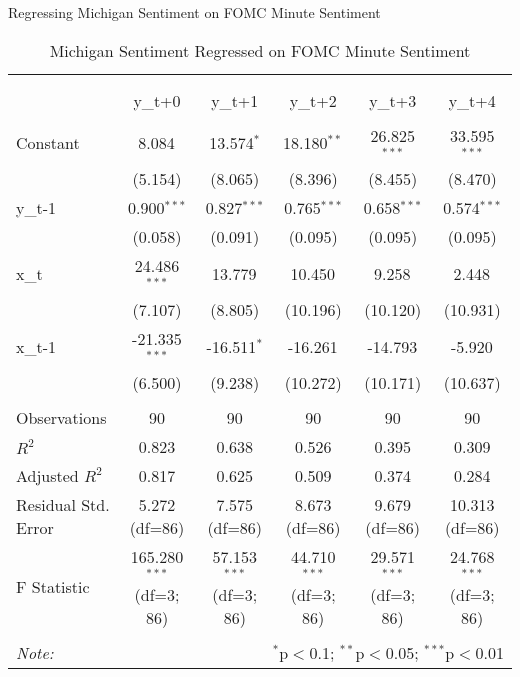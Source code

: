 \documentclass[12pt, letterpaper]{article}
\begin{document}
Regressing Michigan Sentiment on FOMC Minute Sentiment

\begin{table}[H] \centering
  \caption{Michigan Sentiment Regressed on FOMC Minute Sentiment}
\begin{tabular}{@{\extracolsep{5pt}}lccccc}
\\[-1.8ex]\hline
\hline \\[-1.8ex]
\\[-1.8ex] & \multicolumn{1}{c}{y_{t+0}} & \multicolumn{1}{c}{y_{t+1}} & \multicolumn{1}{c}{y_{t+2}} & \multicolumn{1}{c}{y_{t+3}} & \multicolumn{1}{c}{y_{t+4}}  \\
\hline \\[-1.8ex]
 Constant & 8.084$^{}$ & 13.574$^{*}$ & 18.180$^{**}$ & 26.825$^{***}$ & 33.595$^{***}$ \\
& (5.154) & (8.065) & (8.396) & (8.455) & (8.470) \\
 y_{t-1} & 0.900$^{***}$ & 0.827$^{***}$ & 0.765$^{***}$ & 0.658$^{***}$ & 0.574$^{***}$ \\
& (0.058) & (0.091) & (0.095) & (0.095) & (0.095) \\
 x_{t} & 24.486$^{***}$ & 13.779$^{}$ & 10.450$^{}$ & 9.258$^{}$ & 2.448$^{}$ \\
& (7.107) & (8.805) & (10.196) & (10.120) & (10.931) \\
 x_{t-1} & -21.335$^{***}$ & -16.511$^{*}$ & -16.261$^{}$ & -14.793$^{}$ & -5.920$^{}$ \\
& (6.500) & (9.238) & (10.272) & (10.171) & (10.637) \\
\hline \\[-1.8ex]
 Observations & 90 & 90 & 90 & 90 & 90 \\
 $R^2$ & 0.823 & 0.638 & 0.526 & 0.395 & 0.309 \\
 Adjusted $R^2$ & 0.817 & 0.625 & 0.509 & 0.374 & 0.284 \\
 Residual Std. Error & 5.272 (df=86) & 7.575 (df=86) & 8.673 (df=86) & 9.679 (df=86) & 10.313 (df=86) \\
 F Statistic & 165.280$^{***}$ (df=3; 86) & 57.153$^{***}$ (df=3; 86) & 44.710$^{***}$ (df=3; 86) & 29.571$^{***}$ (df=3; 86) & 24.768$^{***}$ (df=3; 86) \\
\hline
\hline \\[-1.8ex]
\textit{Note:} & \multicolumn{5}{r}{$^{*}$p$<$0.1; $^{**}$p$<$0.05; $^{***}$p$<$0.01} \\
\end{tabular}
\end{table}
\end{document}
